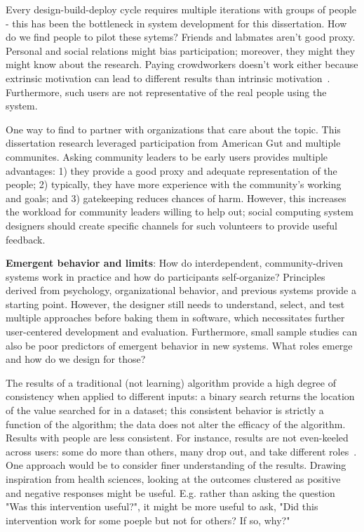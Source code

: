 Every design-build-deploy cycle requires multiple iterations with groups of people - this has been the bottleneck in system development for this dissertation. How do we find people to pilot these sytems? Friends and labmates aren't good proxy. Personal and social relations might bias participation; moreover, they might they might know about the research. Paying crowdworkers doesn't work either because extrinsic motivation can lead to different results than intrinsic motivation~\cite{Chandler2013}. Furthermore, such users are not representative of the real people using the system.

One way to find to partner with organizations that care about the topic. This dissertation research leveraged participation from American Gut and multiple communites. Asking community leaders to be early users provides multiple advantages: 1) they provide a good proxy and adequate representation of the people; 2) typically, they have more experience with the community's working and goals; and 3) gatekeeping reduces chances of harm. However, this increases the workload for community leaders willing to help out; social computing system designers should create specific channels for such volunteers to provide useful feedback.



\textbf{Emergent behavior and limits}: How do interdependent, community-driven systems work in practice and how do participants self-organize? Principles derived from psychology, organizational behavior, and previous systems provide a starting point. However, the designer still needs to understand, select, and test multiple approaches before baking them in software, which necessitates further user-centered development and evaluation. Furthermore, small sample studies can also be poor predictors of emergent behavior in new systems. What roles emerge and how do we design for those?

The results of a traditional (not learning) algorithm provide a high degree of consistency when applied to different inputs: a binary search returns the location of the value searched for in a dataset; this consistent behavior is strictly a function of the algorithm; the data does not alter the efficacy of the algorithm. Results with people are less consistent. For instance, results are not even-keeled across users: some do more than others, many drop out, and take different roles~\cite{Bryant2005}. One approach would be to consider finer understanding of the results. Drawing inspiration from health sciences, looking at the outcomes clustered as positive and negative responses might be useful. E.g. rather than asking the question "Was this intervention useful?", it might be more useful to ask, "Did this intervention work for some poeple but not for others? If so, why?"



